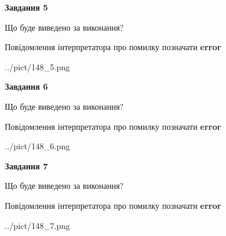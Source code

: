 \documentclass[10pt, ukrainian]{article}
\begin{document}
{\begin {large}
{\begin {center}\textbf{Завдання 5}\end {center}}\par
Що буде виведено за виконання? \par
Повідомлення інтерпретатора про помилку позначати \textbf{error}

\begin{center}
	{../pict/148_5.png}
\end{center}
\newpage

{\begin {center}\textbf{Завдання 6}\end {center}}\par
Що буде виведено за виконання? \par
Повідомлення інтерпретатора про помилку позначати \textbf{error}

\begin{center}
	{../pict/148_6.png}
\end{center}
\newpage

{\begin {center}\textbf{Завдання 7}\end {center}}\par
Що буде виведено за виконання? \par
Повідомлення інтерпретатора про помилку позначати \textbf{error}

\begin{center}
	{../pict/148_7.png}
\end{center}
\newpage

\end {large}}
\end{document}
